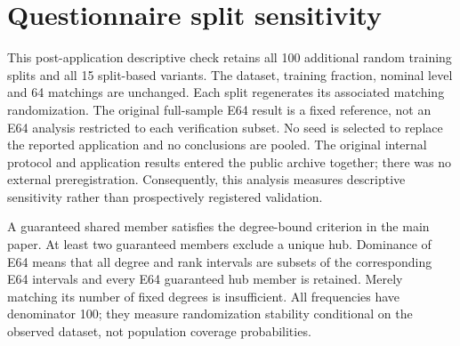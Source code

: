 \section{Questionnaire split sensitivity}\label{sec:split-stability}

This post-application descriptive check retains all 100 additional random training splits and all 15 split-based variants. The dataset, training fraction, nominal level and 64 matchings are unchanged. Each split regenerates its associated matching randomization. The original full-sample E64 result is a fixed reference, not an E64 analysis restricted to each verification subset. No seed is selected to replace the reported application and no conclusions are pooled. The original internal protocol and application results entered the public archive together; there was no external preregistration. Consequently, this analysis measures descriptive sensitivity rather than prospectively registered validation.

A guaranteed shared member satisfies the degree-bound criterion in the main paper. At least two guaranteed members exclude a unique hub. Dominance of E64 means that all degree and rank intervals are subsets of the corresponding E64 intervals and every E64 guaranteed hub member is retained. Merely matching its number of fixed degrees is insufficient. All frequencies have denominator 100; they measure randomization stability conditional on the observed dataset, not population coverage probabilities.

